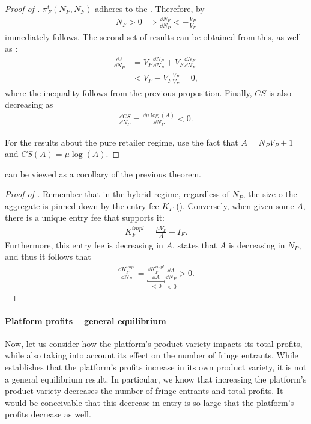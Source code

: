 \begin{proof}[Proof of ]
    $\pi^t_F(N_P ,N_F)$ adheres to the .
    Therefore, by 
    \begin{align*}
        N_F > 0 \implies \frac{\dd N_F}{\dd N_P} < -\frac{V_P}{V_F}
    \end{align*}
    immediately follows.
    The second set of results can be obtained from this, as well as :
    \begin{align*}
        \frac{\dd A}{\dd N_P}& = V_P \frac{\dd N_P}{\dd N_P} + V_F \frac{\dd N_F}{\dd N_P} \\
        &< V_P - V_F \frac{V_P}{V_F} = 0,
    \end{align*}
    where the inequality follows from the previous proposition.
    Finally, $CS$ is also decreasing as
    \begin{align*}
        \frac{\dd CS}{\dd N_P} = \frac{\dd \mu \log(A)}{\dd N_P} < 0.
    \end{align*}
    
    For the results about the pure retailer regime, use the fact that $A = N_P V_P + 1$ and $CS(A) = \mu\log(A)$.
\end{proof}

 can be viewed as a corollary of the previous theorem.
\begin{proof}[Proof of ]
    Remember that in the hybrid regime, regardless of $N_P$, the size o the aggregate is pinned down by the entry fee $K_F$ ().
    Conversely, when given some $A$, there is a unique entry fee that supports it:
    \begin{align*}
        K_F^{impl} = \frac{\mu V_F}{A} - I_F.
    \end{align*}
    Furthermore, this entry fee is decreasing in $A$.
     states that $A$ is decreasing in $N_P$, and thus it follows that
    \begin{align*}
        \frac{\dd K_F^{impl}}{\dd N_P} = \underbracket{\frac{\dd K_F^{impl}}{\dd A}}_{<0} \underbracket{\frac{\dd A}{\dd N_P}}_{<0} > 0.
    \end{align*}
\end{proof}

\paragraph{Platform profits -- general equilibrium}
Now, let us consider how the platform's product variety impacts its total profits, while also taking into account its effect on the number of fringe entrants.
While  establishes that the platform's profits increase in its own product variety, it is not a general equilibrium result.
In particular, we know that increasing the platform's product variety decreases the number of fringe entrants and total profits.
It would be conceivable that this decrease in entry is so large that the platform's profits decrease as well.

